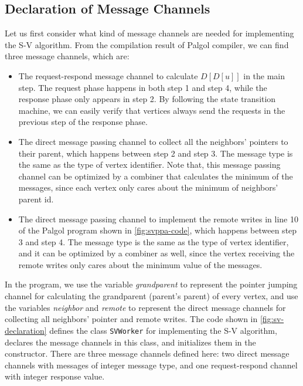 \documentclass{sokendai_thesis} %
\begin{document}
\subsection{Declaration of Message Channels}

Let us first consider what kind of message channels are needed for implementing the S-V algorithm.
From the compilation result of Palgol compiler, we can find three message channels, which are:
\begin{itemize}
\item
 The request-respond message channel to calculate $D[D[u]]$ in the main step.
 The request phase happens in both step 1 and step 4, while the response phase only appears in step 2.
 By following the state transition machine, we can easily verify that vertices always send the requests in the previous step of the response phase.
\item
 The direct message passing channel to collect all the neighbors' pointers to their parent, which happens between step 2 and step 3.
 The message type is the same as the type of vertex identifier.
 Note that, this message passing channel can be optimized by a combiner that calculates the minimum of the messages, since each vertex only cares about the minimum of neighbors' parent id.
\item
 The direct message passing channel to implement the remote writes in line 10 of the Palgol program shown in \autoref{fig:svppa-code}, which happens between step 3 and step 4.
 The message type is the same as the type of vertex identifier, and it can be optimized by a combiner as well, since the vertex receiving the remote writes only cares about the minimum value of the messages.
\end{itemize}

In the program, we use the variable \textit{grandparent} to represent the pointer jumping channel for calculating the grandparent (parent's parent) of every vertex, and use the variables \textit{neighbor} and \textit{remote} to represent the direct message channels for collecting all neighbors' pointer and remote writes.
The code shown in \autoref{fig:sv-declaration} defines the class \texttt{SVWorker} for implementing the S-V algorithm, declares the message channels in this class, and initializes them in the constructor.
There are three message channels defined here: two direct message channels with messages of integer message type, and one request-respond channel with integer response value.
\end{document}

